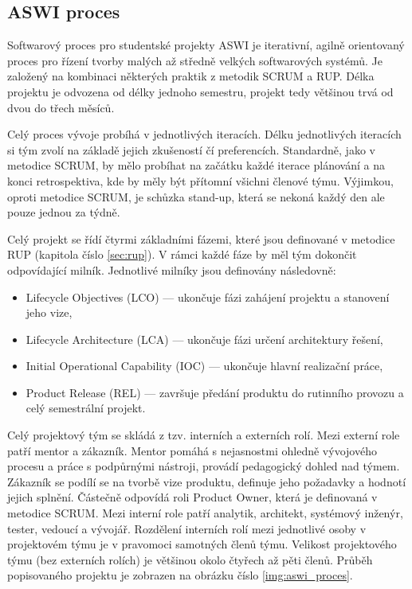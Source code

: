 \documentclass[czech,DP]{thesiskiv}
\begin{document}
\subsection{ASWI proces}\label{sec:aswi_proces}
Softwarový proces pro studentské projekty ASWI je iterativní, agilně orientovaný proces pro řízení tvorby malých až středně velkých softwarových systémů. Je založený na kombinaci některých praktik z metodik SCRUM a RUP. Délka projektu je odvozena od délky jednoho semestru, projekt tedy většinou trvá od dvou do třech měsíců.
\par
Celý proces vývoje probíhá v jednotlivých iteracích. Délku jednotlivých iteracích si tým zvolí na základě jejich zkušeností čí preferencích. Standardně, jako v metodice SCRUM, by mělo probíhat na začátku každé iterace plánování a na konci retrospektiva, kde by měly být přítomní všichni členové týmu. Výjimkou, oproti metodice SCRUM, je schůzka stand-up, která se nekoná každý den ale pouze jednou za týdně.
\par
Celý projekt se řídí čtyrmi základními fázemi, které jsou definované v metodice RUP (kapitola číslo \ref{sec:rup}). V rámci každé fáze by měl tým dokončit odpovídající milník. Jednotlivé milníky jsou definovány následovně:
\begin{itemize}
    \item Lifecycle Objectives (LCO) — ukončuje fázi zahájení projektu a stanovení jeho vize,
    \item Lifecycle Architecture (LCA) — ukončuje fázi určení architektury řešení,
    \item Initial Operational Capability (IOC) — ukončuje hlavní realizační práce,
    \item Product Release (REL) — završuje předání produktu do rutinního provozu a celý semestrální projekt.
\end{itemize}
\par
 Celý projektový tým se skládá z tzv. interních a externích rolí. Mezi externí role patří mentor a zákazník. Mentor pomáhá s nejasnostmi ohledně vývojového procesu a práce s podpůrnými nástroji, provádí pedagogický dohled nad týmem. Zákazník se podílí se na tvorbě vize produktu, definuje jeho požadavky a hodnotí jejich splnění. Částečně odpovídá roli Product Owner, která je definovaná v metodice SCRUM. Mezi interní role patří analytik, architekt, systémový inženýr, tester, vedoucí a vývojář. Rozdělení interních rolí mezi jednotlivé osoby v projektovém týmu je v pravomoci samotných členů týmu. Velikost projektového týmu (bez externích rolích) je většinou okolo čtyřech až pěti členů. Průběh popisovaného projektu je zobrazen na obrázku číslo \ref{img:aswi_proces}.
\end{document}
